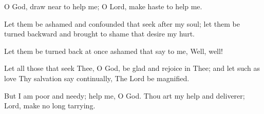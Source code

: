O God, draw near to help me; O Lord, make haste to help me.

Let them be ashamed and confounded that seek after my soul; let them be turned backward and brought to shame that desire my
hurt.

Let them be turned back at once ashamed that say to me, Well, well!

Let all those that seek Thee, O God, be glad and rejoice in Thee; and let such as love Thy salvation say continually, The Lord be magnified.

But I am poor and needy; help me, O God. Thou art my help and deliverer; Lord, make no long tarrying.
